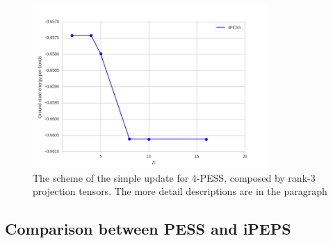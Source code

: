 \begin{figure}[ht]
	\centering
	\includegraphics[width=0.80\textwidth]{figures/4pess_HeiGE.png}
	\caption[The scheme of the simple update for 4-PESS, composed by rank-3 projection tensors.]{The scheme of the simple update for 4-PESS, composed by rank-3 projection tensors. The more detail descriptions are in the paragraph}
	\label{fig4331}
\end{figure}

\subsection{Comparison between PESS and iPEPS}

